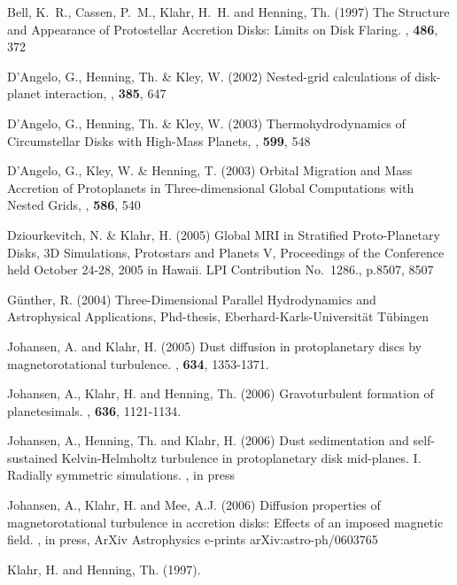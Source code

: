%
%
%
%
\begin{ownpubl}
\item Bell, K.~R., Cassen, P.~M., Klahr, H.~H. and Henning, Th. (1997) 
The Structure and Appearance of Protostellar Accretion Disks: 
Limits on Disk Flaring. \apj, \textbf{486}, 372
%
\item {D'Angelo}, G., Henning, Th. \& {Kley}, W. (2002)
  Nested-grid calculations of disk-planet interaction,
  \aap, \textbf{385}, 647
%
\item {D'Angelo}, G., Henning, Th. \& {Kley}, W. (2003)
  Thermohydrodynamics of Circumstellar Disks with High-Mass Planets,
  \aap, \textbf{599}, 548
%
\item {D'Angelo}, G., {Kley}, W. \& {Henning}, T. (2003)
  Orbital Migration and Mass Accretion of Protoplanets in
  Three-dimensional Global Computations with Nested Grids,
  \apj, \textbf{586}, 540
%
\item  Dziourkevitch, N.  \& Klahr, H. (2005)
  Global MRI in Stratified Proto-Planetary Disks, 3D Simulations,
  Protostars and Planets V, Proceedings of the 
  Conference held October 24-28, 2005 in Hawaii.
  LPI Contribution No.~1286., p.8507, 8507 
%
\item G\"unther, R. (2004)
  Three-Dimensional Parallel Hydrodynamics and Astrophysical Applications,
  Phd-thesis, Eberhard-Karls-Universit\"at T\"ubingen
%
\item Johansen, A. and Klahr, H. (2005) Dust diffusion in protoplanetary discs by
magnetorotational turbulence. \apj, \textbf{634}, 1353-1371.
%
\item Johansen, A., Klahr, H. and  Henning, Th. (2006) 
Gravoturbulent formation of planetesimals. \apj, \textbf{636}, 1121-1134.
%
\item Johansen, A., Henning, Th. and  Klahr, H. (2006) 
Dust sedimentation and self-sustained Kelvin-Helmholtz turbulence
in protoplanetary disk mid-planes. 
I. Radially symmetric simulations. \apj, in press
%
\item Johansen, A., Klahr, H. and Mee, A.J. (2006) 
Diffusion properties of magnetorotational turbulence in accretion disks:
Effects of an imposed magnetic field. \mn, in press, 
ArXiv Astrophysics e-prints arXiv:astro-ph/0603765
%
%
\item Klahr, H. and Henning, Th. (1997). 

\end{ownpubl}
